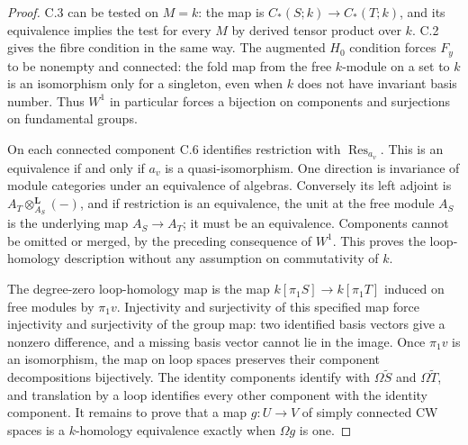 \begin{proof}
C.3 can be tested on $M=k$: the map is $C_*(S;k)\to C_*(T;k)$, and its equivalence implies the test for every $M$ by derived tensor product over $k$.  C.2 gives the fibre condition in the same way.  The augmented $H_0$ condition forces $F_y$ to be nonempty and connected: the fold map from the free $k$-module on a set to $k$ is an isomorphism only for a singleton, even when $k$ does not have invariant basis number.  Thus $W^1$ in particular forces a bijection on components and surjections on fundamental groups.

On each connected component C.6 identifies restriction with $\operatorname{Res}_{a_v}$.  This is an equivalence if and only if $a_v$ is a quasi-isomorphism.  One direction is invariance of module categories under an equivalence of algebras.  Conversely its left adjoint is $A_T\otimes_{A_S}^{\mathbf L}(-)$, and if restriction is an equivalence, the unit at the free module $A_S$ is the underlying map $A_S\to A_T$; it must be an equivalence.  Components cannot be omitted or merged, by the preceding consequence of $W^1$.  This proves the loop-homology description without any assumption on commutativity of $k$.

The degree-zero loop-homology map is the map $k[\pi_1S]\to k[\pi_1T]$ induced on free modules by $\pi_1v$.  Injectivity and surjectivity of this specified map force injectivity and surjectivity of the group map: two identified basis vectors give a nonzero difference, and a missing basis vector cannot lie in the image.  Once $\pi_1v$ is an isomorphism, the map on loop spaces preserves their component decompositions bijectively.  The identity components identify with $\Omega\widetilde S$ and $\Omega\widetilde T$, and translation by a loop identifies every other component with the identity component.  It remains to prove that a map $g:U\to V$ of simply connected CW spaces is a $k$-homology equivalence exactly when $\Omega g$ is one.


\end{proof}
